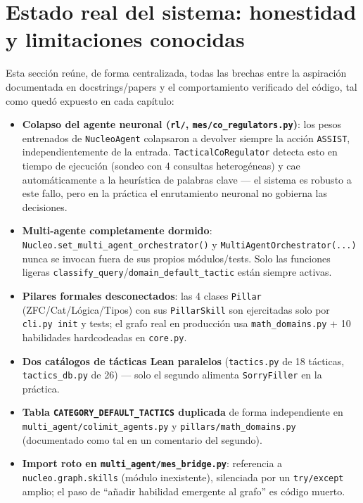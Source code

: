 \documentclass[11pt,a4paper]{report}
\newcommand{\code}[1]{\texttt{#1}}
\begin{document}
\chapter{Estado real del sistema: honestidad y limitaciones conocidas}
\label{sec:gaps}

Esta secci\'on re\'une, de forma centralizada, todas las brechas entre la aspiraci\'on documentada en docstrings/papers y el comportamiento verificado del c\'odigo, tal como qued\'o expuesto en cada cap\'itulo:

\begin{itemize}
  \item \textbf{Colapso del agente neuronal (\code{rl/}, \code{mes/co_regulators.py})}: los pesos entrenados de \code{NucleoAgent} colapsaron a devolver siempre la acci\'on \code{ASSIST}, independientemente de la entrada. \code{TacticalCoRegulator} detecta esto en tiempo de ejecuci\'on (sondeo con 4 consultas heterog\'eneas) y cae autom\'aticamente a la heur\'istica de palabras clave --- el sistema es robusto a este fallo, pero en la pr\'actica el enrutamiento neuronal no gobierna las decisiones.
  \item \textbf{Multi-agente completamente dormido}: \code{Nucleo.set_multi_agent_orchestrator()} y \code{MultiAgentOrchestrator(...)} nunca se invocan fuera de sus propios m\'odulos/tests. Solo las funciones ligeras \code{classify_query}/\code{domain_default_tactic} est\'an siempre activas.
  \item \textbf{Pilares formales desconectados}: las 4 clases \code{Pillar} (ZFC/Cat/L\'ogica/Tipos) con sus \code{PillarSkill} son ejercitadas solo por \code{cli.py init} y tests; el grafo real en producci\'on usa \code{math\_domains.py} + 10 habilidades hardcodeadas en \code{core.py}.
  \item \textbf{Dos cat\'alogos de t\'acticas Lean paralelos} (\code{tactics.py} de 18 t\'acticas, \code{tactics_db.py} de 26) --- solo el segundo alimenta \code{SorryFiller} en la pr\'actica.
  \item \textbf{Tabla \code{CATEGORY\_DEFAULT\_TACTICS} duplicada} de forma independiente en \code{multi_agent/colimit_agents.py} y \code{pillars/math_domains.py} (documentado como tal en un comentario del segundo).
  \item \textbf{Import roto en \code{multi_agent/mes_bridge.py}}: referencia a \code{nucleo.graph.skills} (m\'odulo inexistente), silenciada por un \code{try/except} amplio; el paso de ``a\~nadir habilidad emergente al grafo'' es c\'odigo muerto.

\end{itemize}
\end{document}

